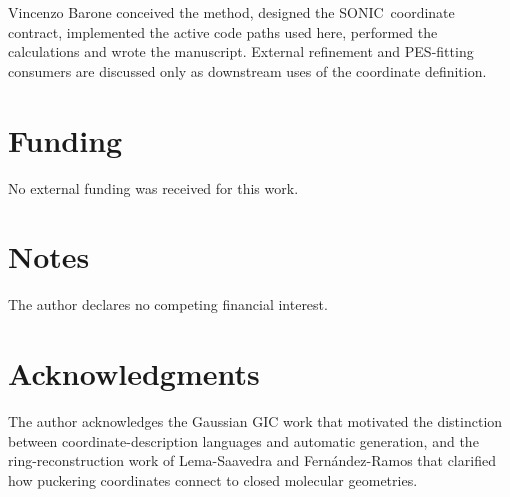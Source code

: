 \documentclass[journal=jctcce,manuscript=article,layout=traditional]{achemso}
\newcommand{\SONIC}{SONIC}
\theoremstyle{definition}
\begin{document}
Vincenzo Barone conceived the method, designed the \SONIC\ coordinate
contract, implemented the active code paths used here, performed the
calculations and wrote the manuscript.  External refinement and PES-fitting
consumers are discussed only as downstream uses of the coordinate definition.

\section*{Funding}

No external funding was received for this work.

\section*{Notes}

The author declares no competing financial interest.

\section*{Acknowledgments}

The author acknowledges the Gaussian GIC work that motivated the distinction
between coordinate-description languages and automatic generation, and the
ring-reconstruction work of Lema-Saavedra and Fern{\'a}ndez-Ramos that clarified
how puckering coordinates connect to closed molecular geometries.


\end{document}
